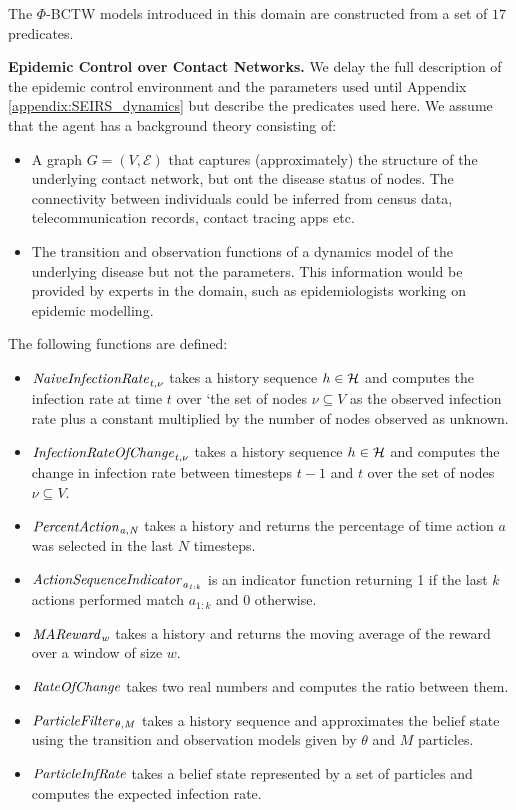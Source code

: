 The $\Phi$-BCTW models introduced in this domain are constructed from a set of $17$ predicates. 

\textbf{Epidemic Control over Contact Networks.}
We delay the full description of the epidemic control environment and the parameters used until Appendix \ref{appendix:SEIRS_dynamics} but describe the predicates used here. We assume that the agent has a background theory consisting of:
\begin{itemize}
    \item A graph $G = (V, \mathcal{E})$ that captures (approximately) the structure of the underlying contact network, but ont the disease status of nodes. The connectivity between individuals could be inferred from census data, telecommunication records, contact tracing apps etc.
    \item The transition and observation functions of a dynamics model of the underlying disease but not the parameters. This information would be provided by experts in the domain, such as epidemiologists working on epidemic modelling. 
\end{itemize}

The following functions are defined:
\begin{itemize}
    \item $\it{NaiveInfectionRate}_{t, \nu}$ takes a history sequence $h \in \mathcal{H}$ and computes the infection rate at time $t$ over `the set of nodes $\nu \subseteq V$ as the observed infection rate plus a constant multiplied by the number of nodes observed as unknown.
    \item $\it{InfectionRateOfChange}_{t, \nu}$ takes a history sequence $h \in \mathcal{H}$ and computes the change in infection rate between timesteps $t-1$ and $t$ over the set of nodes $\nu \subseteq V$. 
    \item $\it{PercentAction}_{a, N}$ takes a history and returns the percentage of time action $a$ was selected in the last $N$ timesteps.
    \item $\it{ActionSequenceIndicator}_{a_{1:k}}$ is an indicator function returning 1 if the last $k$ actions performed match $a_{1:k}$ and 0 otherwise.
    \item $\it{MAReward}_w$ takes a history and returns the moving average of the reward over a window of size $w$. 
    \item $\it{RateOfChange}$ takes two real numbers and computes the ratio between them.
    \item $\it{ParticleFilter}_{\theta, M}$ takes a history sequence and approximates the belief state using the transition and observation models given by $\theta$ and $M$ particles.
    \item $\it{ParticleInfRate}$ takes a belief state represented by a set of particles and computes the expected infection rate. 
\end{itemize}

